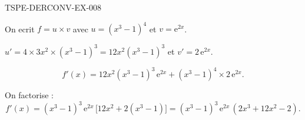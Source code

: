 \begin{corrige}{TSPE-DERCONV-EX-008}

On ecrit $f = u \times v$ avec $u = (x^3-1)^4$ et $v = \mathrm{e}^{2x}$.


$u' = 4 \times 3x^2 \times (x^3-1)^3 = 12x^2(x^3-1)^3$ et $v' = 2\,\mathrm{e}^{2x}$.

\[ f'(x) = 12x^2(x^3-1)^3\,\mathrm{e}^{2x} + (x^3-1)^4 \times 2\,\mathrm{e}^{2x}. \]

On factorise :
\[ f'(x) = (x^3-1)^3\,\mathrm{e}^{2x}\,\bigl[12x^2 + 2(x^3-1)\bigr] = (x^3-1)^3\,\mathrm{e}^{2x}\,(2x^3+12x^2-2). \]

\end{corrige}
